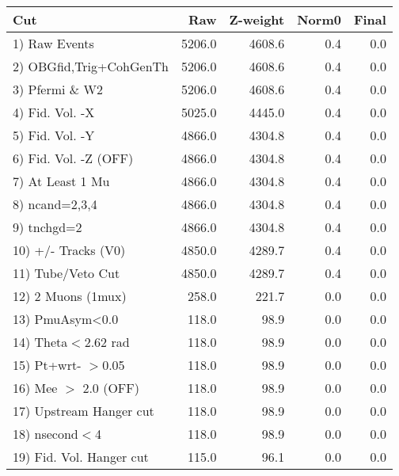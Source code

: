  \begin{table}[h!]\centering
 \begin{tabular}{||l||r|r|r|r||}
 \hline
 \hline
 Cut & Raw & Z-weight & Norm0 & Final \\
 \hline
  1) Raw Events           &      5206.0 &      4608.6 &         0.4 &         0.0 \\
  2) OBGfid,Trig+CohGenTh &      5206.0 &      4608.6 &         0.4 &         0.0 \\
  3) Pfermi \& W2         &      5206.0 &      4608.6 &         0.4 &         0.0 \\
  4) Fid. Vol. -X         &      5025.0 &      4445.0 &         0.4 &         0.0 \\
  5) Fid. Vol. -Y         &      4866.0 &      4304.8 &         0.4 &         0.0 \\
  6) Fid. Vol. -Z (OFF)   &      4866.0 &      4304.8 &         0.4 &         0.0 \\
  7) At Least 1 Mu        &      4866.0 &      4304.8 &         0.4 &         0.0 \\
  8) ncand=2,3,4          &      4866.0 &      4304.8 &         0.4 &         0.0 \\
  9) tnchgd=2             &      4866.0 &      4304.8 &         0.4 &         0.0 \\
 10) +/- Tracks (V0)      &      4850.0 &      4289.7 &         0.4 &         0.0 \\
 11) Tube/Veto Cut        &      4850.0 &      4289.7 &         0.4 &         0.0 \\
 12) 2 Muons (1mux)       &       258.0 &       221.7 &         0.0 &         0.0 \\
 13) PmuAsym<0.0          &       118.0 &        98.9 &         0.0 &         0.0 \\
 14) Theta$<$2.62 rad     &       118.0 &        98.9 &         0.0 &         0.0 \\
 15) Pt+wrt- $>$0.05      &       118.0 &        98.9 &         0.0 &         0.0 \\
 16) Mee $>$ 2.0  (OFF)   &       118.0 &        98.9 &         0.0 &         0.0 \\
 17) Upstream Hanger cut  &       118.0 &        98.9 &         0.0 &         0.0 \\
 18) nsecond$<$4          &       118.0 &        98.9 &         0.0 &         0.0 \\
 19) Fid. Vol. Hanger cut &       115.0 &        96.1 &         0.0 &         0.0 \\

\end{tabular}
\end{table}
